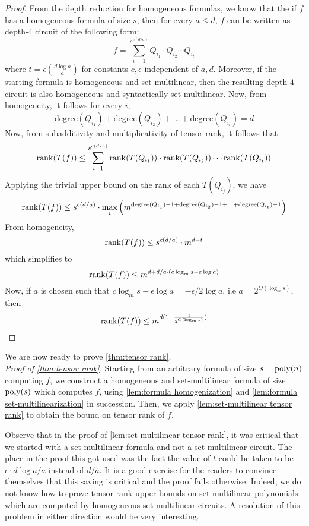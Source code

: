 \begin{proof}
From the depth reduction for homogeneous formulas, we know that the if $f$ has a homogeneous formula of size $s$, then for every $a \leq d$, $f$ can be written as depth-$4$ circuit of the following form:
\[
f = \sum_{i = 1}^{s^{c(d/a)}} Q_{i_1}\cdot Q_{i_2}\cdots Q_{i_t}
\]  
where $t = \epsilon(\frac{d\log a}{a})$ for constants $c, \epsilon$ independent of $a, d$.
Moreover, if the starting formula is homogeneous and set multilinear, then the resulting depth-$4$ circuit is also homogeneous and syntactically set multilinear.
Now, from homogeneity, it follows for every $i$,
\[\text{degree}(Q_{i_1}) + \text{degree}(Q_{i_2}) + \ldots + \text{degree}(Q_{i_t}) = d\] 
Now, from subadditivity and multiplicativity of tensor rank, it follows that 
\[
\operatorname{rank}(T(f)) \leq  \sum_{i = 1}^{s^{c(d/a)}} \operatorname{rank} (T(Q_{i_1}))\cdot \operatorname{rank}(T(Q_{i_2}))\cdots \operatorname{rank}(T(Q_{i_t}))
\]
Applying the trivial upper bound on the rank of each $T(Q_{i_j})$, we have 
\[
\operatorname{rank}(T(f)) \leq s^{c(d/a)}\cdot \max_i \left(m^{\text{degree}(Q_{i_1})-1 + \text{degree}(Q_{i_2})-1 + \ldots + \text{degree}(Q_{i_t})-1}\right) 
\]
From homogeneity, 
\[
\operatorname{rank}(T(f)) \leq s^{c(d/a)}\cdot m^{d-t} 
\]
which simplifies to
\[
\operatorname{rank}(T(f)) \leq m^{d + d/a \cdot (c\log_m s - \varepsilon \log a)} 
\]
Now, if $a$ is chosen such that $c\log_m s - \epsilon \log a = -\epsilon/2 \log a$, i.e $a = 2^{O(\log_m s)}$, then  
\[
\operatorname{rank}(T(f)) \leq m^{d( 1- \frac{1}{2^{O(\log_m s)}})} 
\]
\end{proof}

We are now ready to prove \autoref{thm:tensor rank}.
\\ {\it Proof of \autoref{thm:tensor rank}.}
Starting from an arbitrary formula of size $s = \operatorname{poly}(n)$ computing $f$, we construct a homogeneous and set-multilinear formula of size $\operatorname{poly}(s)$ which computes $f$, using \autoref{lem:formula homogenization} and \autoref{lem:formula set-multilinearization} in succession.
Then, we apply \autoref{lem:set-multilinear tensor rank} to obtain the bound on tensor rank of $f$.
\qedhere


\begin{remark}
  Observe that in the proof of \autoref{lem:set-multilinear tensor rank}, it was critical that we started with a set multilinear formula and not a set multilinear circuit.
The place in the proof this got used was the fact the value of $t$ could be taken to be $\epsilon \cdot d\log a/a$ instead of $d/a$.
It is a good exercise for the readers to convince themselves that this saving is critical and the proof fails otherwise.
Indeed, we do not know how to prove tensor rank upper bounds on set multilinear polynomials which are computed by homogeneous set-multilinear circuits.
A resolution of this problem in either direction would be very interesting.
\end{remark}



